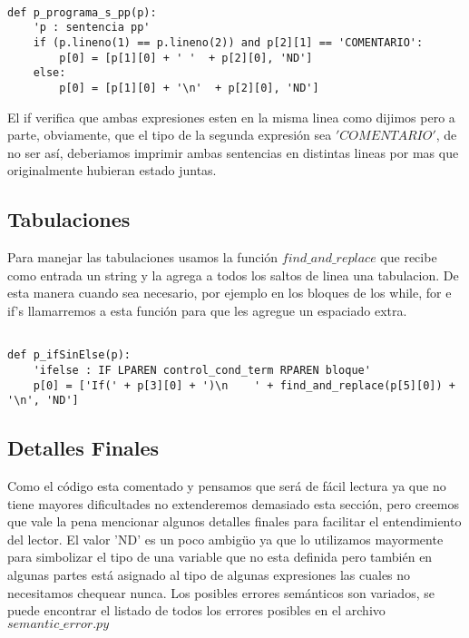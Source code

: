\begin{verbatim}

def p_programa_s_pp(p):
    'p : sentencia pp'
    if (p.lineno(1) == p.lineno(2)) and p[2][1] == 'COMENTARIO':    	
        p[0] = [p[1][0] + ' '  + p[2][0], 'ND']
    else:
        p[0] = [p[1][0] + '\n'  + p[2][0], 'ND']

\end{verbatim} 

El if verifica que ambas expresiones esten en la misma linea como dijimos pero a parte, obviamente, que el tipo de la segunda expresión sea $'COMENTARIO'$, de no ser así, deberiamos imprimir ambas sentencias en distintas lineas por mas que originalmente hubieran estado juntas.

\subsection{Tabulaciones}

Para manejar las tabulaciones usamos la función $find\_and\_replace$ que recibe como entrada un string y la agrega a todos los saltos de linea una tabulacion. De esta manera cuando sea necesario, por ejemplo en los bloques de los while, for e if's llamarremos a esta función para que les agregue un espaciado extra.

\begin{verbatim}

def p_ifSinElse(p):
    'ifelse : IF LPAREN control_cond_term RPAREN bloque'
    p[0] = ['If(' + p[3][0] + ')\n    ' + find_and_replace(p[5][0]) + '\n', 'ND']

\end{verbatim}

\subsection{Detalles Finales}

Como el código esta comentado y pensamos que será de fácil lectura ya que no tiene mayores dificultades no extenderemos demasiado esta sección, pero creemos que vale la pena mencionar algunos detalles finales para facilitar el entendimiento del lector. El valor 'ND' es un poco ambigüo ya que lo utilizamos mayormente para simbolizar el tipo de una variable que no esta definida pero también en algunas partes está asignado al tipo de algunas expresiones las cuales no necesitamos chequear nunca. Los posibles errores semánticos son variados, se puede encontrar el listado de todos los errores posibles en el archivo $semantic\_error.py$